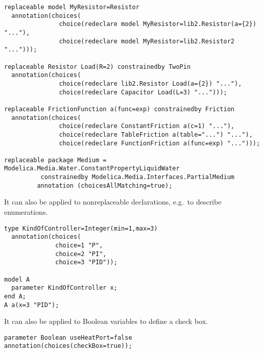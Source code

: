 \begin{example}
\begin{lstlisting}[language=modelica]
replaceable model MyResistor=Resistor
  annotation(choices(
               choice(redeclare model MyResistor=lib2.Resistor(a={2}) "..."),
               choice(redeclare model MyResistor=lib2.Resistor2 "...")));

replaceable Resistor Load(R=2) constrainedby TwoPin
  annotation(choices(
               choice(redeclare lib2.Resistor Load(a={2}) "..."),
               choice(redeclare Capacitor Load(L=3) "...")));

replaceable FrictionFunction a(func=exp) constrainedby Friction
  annotation(choices(
               choice(redeclare ConstantFriction a(c=1) "..."),
               choice(redeclare TableFriction a(table="...") "..."),
               choice(redeclare FunctionFriction a(func=exp) "...")));

replaceable package Medium = Modelica.Media.Water.ConstantPropertyLiquidWater
          constrainedby Modelica.Media.Interfaces.PartialMedium
	     annotation (choicesAllMatching=true);
\end{lstlisting}

It can also be applied to nonreplaceable declarations, e.g.\ to
describe enumerations.
\begin{lstlisting}[language=modelica]
type KindOfController=Integer(min=1,max=3)
  annotation(choices(
              choice=1 "P",
              choice=2 "PI",
              choice=3 "PID"));

model A
  parameter KindOfController x;
end A;
A a(x=3 "PID");
\end{lstlisting}

It can also be applied to Boolean variables to define a check
box.
\begin{lstlisting}[language=modelica]
parameter Boolean useHeatPort=false annotation(choices(checkBox=true));
\end{lstlisting}

\end{example}
